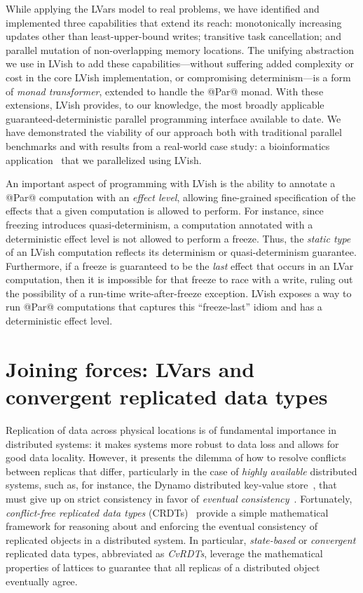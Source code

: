 \documentclass{article}
\begin{document}
While applying the LVars model to real problems, we have identified
and implemented three capabilities that extend its reach:
monotonically increasing updates other than least-upper-bound writes;
transitive task cancellation; and parallel mutation of non-overlapping
memory locations. The unifying abstraction we use in LVish to add
these capabilities---without suffering added complexity or cost in the
core LVish implementation, or compromising determinism---is a form of
\emph{monad transformer}, extended to handle the @Par@ monad.  With
these extensions, LVish provides, to our knowledge, the most broadly
applicable guaranteed-deterministic parallel programming interface
available to date. We have demonstrated the viability of our approach
both with traditional parallel benchmarks and with results from a
real-world case study: a bioinformatics application~\cite{phybin} that
we parallelized using LVish.

An important aspect of programming with LVish is the ability to
annotate a @Par@ computation with an \emph{effect level}, allowing
fine-grained specification of the effects that a given computation is
allowed to perform.  For instance, since freezing introduces
quasi-determinism, a computation annotated with a deterministic effect
level is not allowed to perform a freeze.  Thus, the \emph{static
  type} of an LVish computation reflects its determinism or
quasi-determinism guarantee.  Furthermore, if a freeze is guaranteed
to be the \emph{last} effect that occurs in an LVar computation, then
it is impossible for that freeze to race with a write, ruling out the
possibility of a run-time write-after-freeze exception.  LVish exposes
a way to run @Par@ computations that captures this ``freeze-last''
idiom and has a deterministic effect level.

\section{Joining forces: LVars and convergent replicated data types}\label{crdts}

Replication of data across physical locations is of fundamental
importance in distributed systems: it makes systems more robust to
data loss and allows for good data locality.  However, it presents the
dilemma of how to resolve conflicts between replicas that differ,
particularly in the case of \emph{highly available} distributed
systems, such as, for instance, the Dynamo distributed key-value
store~\cite{dynamo}, that must give up on strict consistency in favor
of \emph{eventual consistency}~\cite{vogels-ec}.  Fortunately,
\emph{conflict-free replicated data types} (CRDTs)~\cite{crdts}
provide a simple mathematical framework for reasoning about and
enforcing the eventual consistency of replicated objects in a
distributed system.  In particular, \emph{state-based} or
\emph{convergent} replicated data types, abbreviated as \emph{CvRDTs},
leverage the mathematical properties of lattices to guarantee that all
replicas of a distributed object eventually agree.
\end{document}
